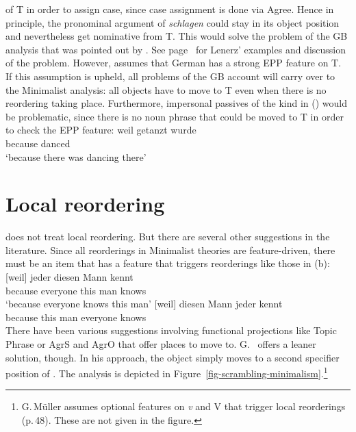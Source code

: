 of T in order to assign case, since case assignment is done via Agree. Hence in principle, the pronominal argument
of \emph{schlagen} could stay in its object position and nevertheless get nominative
from T. This would solve the problem of the GB analysis that was pointed out by \citet[Section~4.4.3]{Lenerz77}. See
page~\pageref{ex-passive-German-no-movement} for Lenerz' examples and discussion of the
problem.
However, \citet[]{Adger2003a} assumes that German has a strong EPP feature on T. If this
assumption is upheld, all problems of the GB account will carry over to the Minimalist analysis: all
objects have to move to T even when there is no reordering taking place. Furthermore, impersonal
passives of the kind in () would be problematic, since there is no noun phrase that could be
moved to T in order to check the EPP feature:
\ea
\gll weil getanzt wurde\\
     because danced \AUX\\
\glt `because there was dancing there'
\z
{}

\section{Local reordering}

\citet{Adger2003a} does not treat local reordering. But there are several other suggestions in the
literature. Since all reorderings in Minimalist theories are feature-driven, there must be an item
that has a feature that triggers reorderings like those in (b):
\eal
\ex 
\gll {}[weil] jeder diesen Mann kennt\\
	 {}\spacebr{}because everyone this man knows\\
\glt `because everyone knows this man'
\ex 
\gll {}[weil] diesen Mann jeder kennt\\
	 {}\spacebr{}because this man everyone knows\\
\zl
There have been various suggestions involving functional projections like Topic Phrase \citep[]{Laenzlinger2004a} or AgrS and
AgrO \citep[Chapter~4]{Meinunger2000a} that offer places to move to. G.\ \citet[Section~3.5]{GMueller2014a-u} offers a leaner solution, though. In his approach, the
object simply moves to a second specifier position of \littlev. The analysis is depicted in
Figure~\vref{fig-scrambling-minimalism}.\footnote{%
  G.\,Müller assumes optional features on \textit{v} and V that trigger local reorderings (p.\,48). These are not
  given in the figure.
} 

